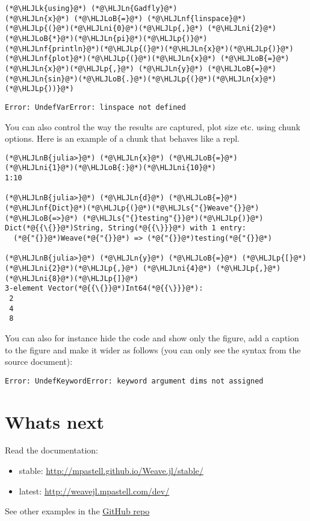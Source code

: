 \documentclass[12pt,a4paper]{article}
\newcommand{\HLJLk}[1]{\textcolor[RGB]{148,91,176}{\textbf{#1}}}
\newcommand{\HLJLn}[1]{#1}
\newcommand{\HLJLnf}[1]{\textcolor[RGB]{66,102,213}{#1}}
\newcommand{\HLJLs}[1]{\textcolor[RGB]{201,61,57}{#1}}
\newcommand{\HLJLnB}[1]{\textcolor[RGB]{59,151,46}{#1}}
\newcommand{\HLJLni}[1]{\textcolor[RGB]{59,151,46}{#1}}
\newcommand{\HLJLoB}[1]{\textcolor[RGB]{102,102,102}{\textbf{#1}}}
\newcommand{\HLJLp}[1]{#1}
\begin{document}
\begin{lstlisting}
(*@\HLJLk{using}@*) (*@\HLJLn{Gadfly}@*)
(*@\HLJLn{x}@*) (*@\HLJLoB{=}@*) (*@\HLJLnf{linspace}@*)(*@\HLJLp{(}@*)(*@\HLJLni{0}@*)(*@\HLJLp{,}@*) (*@\HLJLni{2}@*)(*@\HLJLoB{*}@*)(*@\HLJLn{pi}@*)(*@\HLJLp{)}@*)
(*@\HLJLnf{println}@*)(*@\HLJLp{(}@*)(*@\HLJLn{x}@*)(*@\HLJLp{)}@*)
(*@\HLJLnf{plot}@*)(*@\HLJLp{(}@*)(*@\HLJLn{x}@*) (*@\HLJLoB{=}@*) (*@\HLJLn{x}@*)(*@\HLJLp{,}@*) (*@\HLJLn{y}@*) (*@\HLJLoB{=}@*) (*@\HLJLn{sin}@*)(*@\HLJLoB{.}@*)(*@\HLJLp{(}@*)(*@\HLJLn{x}@*)(*@\HLJLp{))}@*)
\end{lstlisting}

\begin{lstlisting}
Error: UndefVarError: linspace not defined
\end{lstlisting}


You can also control the way the results are captured, plot size etc. using chunk options. Here is an example of a chunk that behaves like a repl.


\begin{lstlisting}
(*@\HLJLnB{julia>}@*) (*@\HLJLn{x}@*) (*@\HLJLoB{=}@*) (*@\HLJLni{1}@*)(*@\HLJLoB{:}@*)(*@\HLJLni{10}@*)
1:10

(*@\HLJLnB{julia>}@*) (*@\HLJLn{d}@*) (*@\HLJLoB{=}@*) (*@\HLJLnf{Dict}@*)(*@\HLJLp{(}@*)(*@\HLJLs{"{}Weave"{}}@*) (*@\HLJLoB{=>}@*) (*@\HLJLs{"{}testing"{}}@*)(*@\HLJLp{)}@*)
Dict(*@{{\{}}@*)String, String(*@{{\}}}@*) with 1 entry:
  (*@{"{}}@*)Weave(*@{"{}}@*) => (*@{"{}}@*)testing(*@{"{}}@*)

(*@\HLJLnB{julia>}@*) (*@\HLJLn{y}@*) (*@\HLJLoB{=}@*) (*@\HLJLp{[}@*)(*@\HLJLni{2}@*)(*@\HLJLp{,}@*) (*@\HLJLni{4}@*) (*@\HLJLp{,}@*)(*@\HLJLni{8}@*)(*@\HLJLp{]}@*)
3-element Vector(*@{{\{}}@*)Int64(*@{{\}}}@*):
 2
 4
 8
\end{lstlisting}

You can also for instance hide the code and show only the figure, add a caption to the figure and make it wider as follows (you can only see the syntax from the source document):


\begin{lstlisting}
Error: UndefKeywordError: keyword argument dims not assigned
\end{lstlisting}


\section{Whats next}
Read the documentation:

\begin{itemize}
\item stable: \href{http://mpastell.github.io/Weave.jl/stable/}{http://mpastell.github.io/Weave.jl/stable/}


\item latest: \href{http://weavejl.mpastell.com/dev/}{http://weavejl.mpastell.com/dev/}

\end{itemize}
See other examples in the \href{https://github.com/JunoLab/Weave.jl/tree/master/examples}{GitHub repo}
\end{document}
